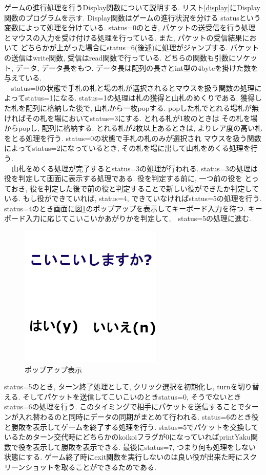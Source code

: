 \documentclass[a4j]{jarticle}
\begin{document}
    ゲームの進行処理を行うDisplay関数について説明する. リスト\ref{display}にDisplay関数のプログラムを示す. Display関数はゲームの進行状況を分ける
    statusという変数によって処理を分けている. status=0のとき, パケットの送受信を行う処理とマウスの入力を受け付ける処理を行っている. また, パケットの受信結果において
    どちらかが上がった場合にstatus=6(後述)に処理がジャンプする. パケットの送信はwrite関数, 受信はread関数で行っている. どちらの関数も引数にソケット, データ, データ長をもつ.
    データ長は配列の長さとint型の4byteを掛けた数を与えている. \\
    　status=0の状態で手札の札と場の札が選択されるとマウスを扱う関数の処理によってstatus=1になる. status=1の処理は札の獲得と山札のめくりである.
    獲得した札を配列に格納した後で, 山札から一枚popする. popした札でとれる場札が無ければその札を場においてstatus=3にする. とれる札が1枚のときは
    その札を場からpopし, 配列に格納する. とれる札が2枚以上あるときは, よりレア度の高い札をとる処理を行う.  status=0の状態で手札の札のみが選択され
    マウスを扱う関数によってstatus=2になっているとき, その札を場に出して山札をめくる処理を行う.\\
    　山札をめくる処理が完了するとstatus=3の処理が行われる. status=3の処理は役を判定して画面に表示する処理である. 役を判定する前に, 一つ前の役を
    とっておき, 役を判定した後で前の役と判定することで新しい役ができたか判定している. もし役ができていれば, status=4, できていなければstatus=5の処理を行う.
    status=4のとき画面に図\ref{koikoi}のポップアップを表示してキーボード入力を待つ. キーボード入力に応じてこいこいかあがりかを判定して,　status=5の処理に進む.

    \begin{figure}[H]
    \centering
    \includegraphics[scale=1.5]{./img/koikoi.png}
    \caption{ポップアップ表示}
    \label{koikoi}
    \end{figure}

    status=5のとき, ターン終了処理として, クリック選択を初期化し, turnを切り替える. そしてパケットを送信してこいこいのときstatus=0, そうでないときstatus=6の処理を行う.
    このタイミングで相手にパケットを送信することでターンが入れ替わるのと同時にデータの同期がまとめて行われる. status=6のとき役と勝敗を表示してゲームを終了する処理を行う.
    status=5でパケットを交換しているためターン交代時にどちらかのkoikoiフラグが0になっていればprintYaku関数で役を表示して勝敗を表示できる. 最後にstatus=7, つまり何も処理をしない
    状態にする. ゲーム終了時にexit関数を実行しないのは良い役が出来た時にスクリーンショットを取ることができるためである.
\end{document}
